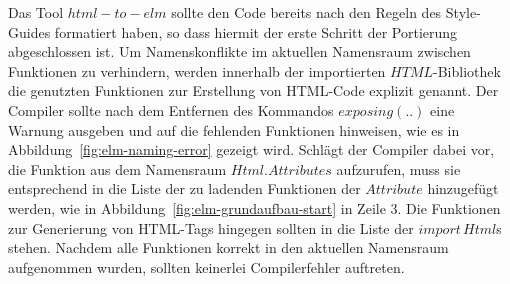 Das Tool $html-to-elm$ sollte den Code bereits nach den Regeln des Style-Guides formatiert haben, so dass hiermit der erste Schritt der Portierung abgeschlossen ist. Um Namenskonflikte im aktuellen Namensraum zwischen Funktionen zu verhindern, werden innerhalb der importierten $HTML$-Bibliothek die genutzten Funktionen zur Erstellung von \ac{HTML}-Code explizit genannt. Der Compiler sollte nach dem Entfernen des Kommandos $exposing (..)$ eine Warnung ausgeben und auf die fehlenden Funktionen hinweisen, wie es in Abbildung~\ref{fig:elm-naming-error} gezeigt wird. Schlägt der Compiler dabei vor, die Funktion aus dem Namensraum $Html.Attributes$ aufzurufen, muss sie entsprechend in die Liste der zu ladenden Funktionen der $Attribute$ hinzugefügt werden, wie in Abbildung~\ref{fig:elm-grundaufbau-start} in Zeile 3. Die Funktionen zur Generierung von \ac{HTML}-Tags hingegen sollten in die Liste der $import\,Html$s stehen. Nachdem alle Funktionen korrekt in den aktuellen Namensraum aufgenommen wurden, sollten keinerlei Compilerfehler auftreten.

